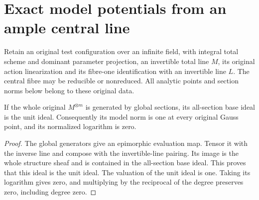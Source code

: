 \section{Exact model potentials from an ample central line}

Retain an original test configuration over an infinite field, with integral
total scheme and dominant parameter projection, an invertible total line
$M$, its original action linearization and its fibre-one identification
with an invertible line $L$. The central fibre may be reducible or nonreduced.
All analytic points and section norms below belong to these original data.

\begin{lemma}
\label{lem:central-ample-generated-power-zero-logarithm}
\leanok
If the whole original $M^{\otimes m}$ is generated by global sections,
its all-section base ideal is the unit ideal. Consequently its model norm
is one at every original Gauss point, and its normalized logarithm is zero.
\end{lemma}
\begin{proof}
\leanok
The global generators give an epimorphic evaluation map. Tensor it with
the inverse line and compose with the invertible-line pairing. Its image
is the whole structure sheaf and is contained in the all-section base
ideal. This proves that this ideal is the unit ideal. The valuation of
the unit ideal is one. Taking its logarithm gives zero, and multiplying
by the reciprocal of the degree preserves zero, including degree zero.
\end{proof}

